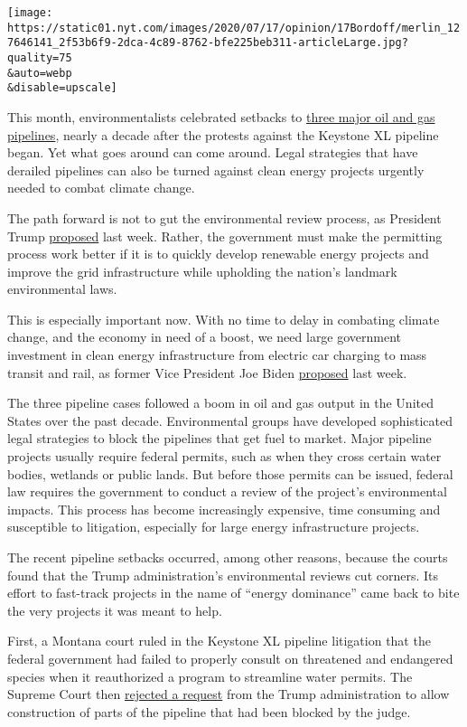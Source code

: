 \texttt{[image: https://static01.nyt.com/images/2020/07/17/opinion/17Bordoff/merlin\_127646141\_2f53b6f9-2dca-4c89-8762-bfe225beb311-articleLarge.jpg?quality=75\\\&auto=webp\\\&disable=upscale]}

This month, environmentalists celebrated setbacks to
\href{https://www.nytimes.com/reuters/2020/07/08/us/08reuters-usa-pipelines.html}{three
major oil and gas pipelines}, nearly a decade after the protests against
the Keystone XL pipeline began. Yet what goes around can come around.
Legal strategies that have derailed pipelines can also be turned against
clean energy projects urgently needed to combat climate change.

The path forward is not to gut the environmental review process, as
President Trump
\href{https://www.nytimes.com/2020/07/15/climate/trump-environment-nepa.html}{proposed}
last week. Rather, the government must make the permitting process work
better if it is to quickly develop renewable energy projects and improve
the grid infrastructure while upholding the nation's landmark
environmental laws.

This is especially important now. With no time to delay in combating
climate change, and the economy in need of a boost, we need large
government investment in clean energy infrastructure from electric car
charging to mass transit and rail, as former Vice President Joe Biden
\href{https://www.nytimes.com/2020/07/14/us/politics/biden-climate-plan.html}{proposed}
last week.

The three pipeline cases followed a boom in oil and gas output in the
United States over the past decade. Environmental groups have developed
sophisticated legal strategies to block the pipelines that get fuel to
market. Major pipeline projects usually require federal permits, such as
when they cross certain water bodies, wetlands or public lands. But
before those permits can be issued, federal law requires the government
to conduct a review of the project's environmental impacts. This process
has become increasingly expensive, time consuming and susceptible to
litigation, especially for large energy infrastructure projects.

The recent pipeline setbacks occurred, among other reasons, because the
courts found that the Trump administration's environmental reviews cut
corners. Its effort to fast-track projects in the name of ``energy
dominance'' came back to bite the very projects it was meant to help.

First, a Montana court ruled in the Keystone XL pipeline litigation that
the federal government had failed to properly consult on threatened and
endangered species when it reauthorized a program to streamline water
permits. The Supreme Court then
\href{https://www.supremecourt.gov/orders/courtorders/070620zr_2d83.pdf}{rejected
a request} from the Trump administration to allow construction of parts
of the pipeline that had been blocked by the judge.

